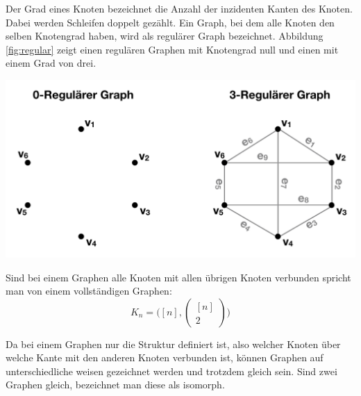 Der Grad eines Knoten bezeichnet die Anzahl der inzidenten Kanten des Knoten.
Dabei werden Schleifen doppelt gezählt.\cite[Seite 13]{rahm2017}
Ein Graph, bei dem alle Knoten den selben Knotengrad haben, wird als regulärer Graph bezeichnet.\cite{felsner2012geometric}
Abbildung \ref{fig:regular} zeigt einen regulären Graphen mit Knotengrad null und einen mit einem Grad von drei.
\begin{center}
	\includegraphics[scale = 0.4]{./images/Regulaerer_graph.png}
	\label{fig:regular}
\end{center}
Sind bei einem Graphen alle Knoten mit allen übrigen Knoten verbunden spricht man von einem vollständigen Graphen:
\[K_{n}=\big([n],\begin{pmatrix}
					 [n] \\ 2
\end{pmatrix}\big)\]

Da bei einem Graphen nur die Struktur definiert ist, also welcher Knoten über welche Kante mit den anderen Knoten verbunden ist, können Graphen auf unterschiedliche weisen gezeichnet werden und trotzdem gleich sein.
Sind zwei Graphen gleich, bezeichnet man diese als isomorph.\cite[Seite 22]{basicgraphtheory}

